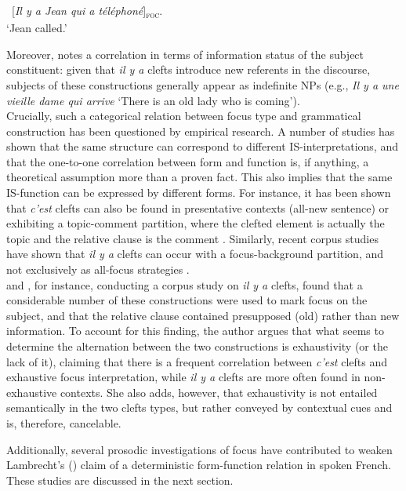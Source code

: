 \ea \label{ex35}
 \ {[\textit{Il y a Jean qui a téléphoné}]\textsubscript{\textsc{foc}}}\normalsize.\\
`Jean called.' \hfill \parencite[136]{lambrecht1988presentational}
\z


Moreover, \textcite{lambrecht2010constraints} notes a correlation in terms of information status of the subject constituent: given that \textit{il y a} clefts introduce new referents in the discourse, subjects of these constructions generally appear as indefinite NPs (e.g., \textit{Il y a une vieille dame qui arrive} `There is an old lady who is coming'). \\
Crucially, such a categorical relation between focus type and grammatical construction has been questioned by empirical research. A number of studies has shown that the same structure can correspond to different IS-interpretations, and that the one-to-one correlation between form and function is, if anything, a theoretical assumption more than a proven fact. This also implies that the same IS-function can be expressed by different forms. For instance, it has been shown that \textit{c’est} clefts can also be found in presentative contexts (all-new sentence) or exhibiting a topic-comment partition, where the clefted element is actually the topic and the relative clause is the comment \parencite{dufter2009clefting}.
Similarly, recent corpus studies have shown that \textit{il y a} clefts can occur with a focus-background partition, and not exclusively as all-focus strategies \parencite{skopeteas2010focus, karssenberg2017oiseaux, karssenberg20188}. \\
\textcite{karssenberg2017oiseaux} and \textcite{Karssenberg2018}, for instance, conducting a corpus study on \textit{il y a} clefts, found that a considerable number of these constructions were used to mark focus on the subject, and that the relative clause contained presupposed (old) rather than new information.
To account for this finding, the author argues that what seems to determine the alternation between the two constructions is exhaustivity (or the lack of it), claiming that there is a frequent correlation between \textit{c’est} clefts and exhaustive focus interpretation, while \textit{il y a} clefts are more often found in non-exhaustive contexts. She also adds, however, that exhaustivity is not entailed semantically in the two clefts types, but rather conveyed by contextual cues and is, therefore, cancelable.

Additionally, several prosodic investigations of focus have contributed to weaken Lambrecht’s (\citeyear{lambrecht1996information}) claim  of a deterministic form-function relation in spoken French. These studies are discussed in the next section.

